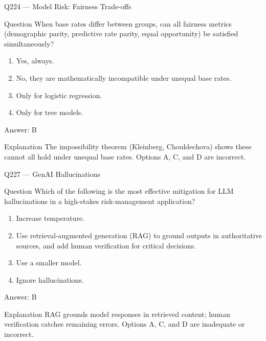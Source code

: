 \documentclass[aspectratio=169,8pt]{beamer}
\begin{document}
			\begin{frame}{Q224 --- Model Risk: Fairness Trade-offs}
				\begin{block}{Question}
					When base rates differ between groups, can all fairness metrics (demographic parity, predictive rate parity, equal opportunity) be satisfied simultaneously?
					\begin{enumerate}
						\item Yes, always.
						\item No, they are mathematically incompatible under unequal base rates.
						\item Only for logistic regression.
						\item Only for tree models.
					\end{enumerate}  \end{block}
					\begin{exampleblock}{Answer: B}\end{exampleblock}
					\begin{block}{Explanation}
						The impossibility theorem (Kleinberg, Chouldechova) shows these cannot all hold under unequal base rates. Options A, C, and D are incorrect.
					\end{block}
				\end{frame}
			
					
				
																																		
																																		\begin{frame}{Q227 --- GenAI Hallucinations}
																																			\begin{block}{Question}
																																				Which of the following is the most effective mitigation for LLM hallucinations in a high-stakes risk-management application?
																																				\begin{enumerate}
																																					\item Increase temperature.
																																					\item Use retrieval-augmented generation (RAG) to ground outputs in authoritative sources, and add human verification for critical decisions.
																																					\item Use a smaller model.
																																					\item Ignore hallucinations.
																																				\end{enumerate}  \end{block}
																																				\begin{exampleblock}{Answer: B}\end{exampleblock}
																																				\begin{block}{Explanation}
																																					RAG grounds model responses in retrieved content; human verification catches remaining errors. Options A, C, and D are inadequate or incorrect.
																																				\end{block}
																																			\end{frame}
																																			
\end{document}
